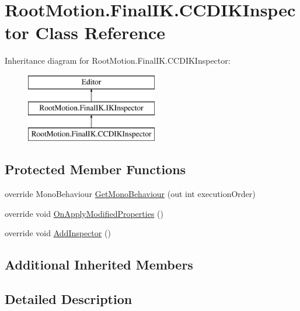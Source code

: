 \hypertarget{class_root_motion_1_1_final_i_k_1_1_c_c_d_i_k_inspector}{}\section{Root\+Motion.\+Final\+I\+K.\+C\+C\+D\+I\+K\+Inspector Class Reference}
\label{class_root_motion_1_1_final_i_k_1_1_c_c_d_i_k_inspector}
Inheritance diagram for Root\+Motion.\+Final\+I\+K.\+C\+C\+D\+I\+K\+Inspector\+:\begin{figure}[H]
\begin{center}
\leavevmode
\includegraphics[height=3.000000cm]{class_root_motion_1_1_final_i_k_1_1_c_c_d_i_k_inspector}
\end{center}
\end{figure}
\subsection*{Protected Member Functions}
\begin{DoxyCompactItemize}
\item 
override Mono\+Behaviour \mbox{\hyperlink{class_root_motion_1_1_final_i_k_1_1_c_c_d_i_k_inspector_a2077a0326ba192d01ada269d2fbd4ab3}{Get\+Mono\+Behaviour}} (out int execution\+Order)
\item 
override void \mbox{\hyperlink{class_root_motion_1_1_final_i_k_1_1_c_c_d_i_k_inspector_a38d0e00d987c69c86bbb08fddc35336e}{On\+Apply\+Modified\+Properties}} ()
\item 
override void \mbox{\hyperlink{class_root_motion_1_1_final_i_k_1_1_c_c_d_i_k_inspector_ac6f83997f8ad1931a3e824852464f10e}{Add\+Inspector}} ()
\end{DoxyCompactItemize}
\subsection*{Additional Inherited Members}


\subsection{Detailed Description}


